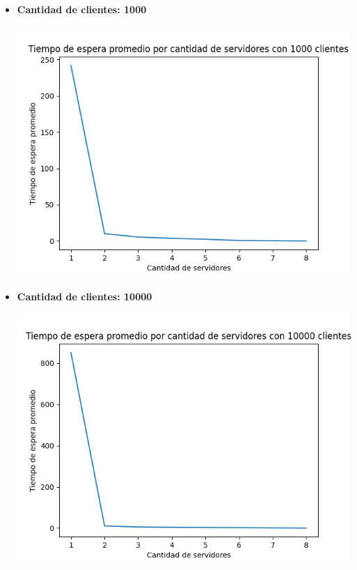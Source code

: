 \documentclass[article]{amsart}
\begin{document}
\begin{itemize}
\newpage
\begin{itemize}
\item \textbf{Cantidad de clientes: 1000}
\begin{center}
\includegraphics[scale=0.5]{../assets/Tiempo de espera promedio por cantidad de servidores con 1000 clientes.png}
\end{center}

\newpage
\item \textbf{Cantidad de clientes: 10000}
\begin{center}
\includegraphics[scale=0.5]{../assets/Tiempo de espera promedio por cantidad de servidores con 10000 clientes.png}
\end{center}

\end{itemize}


\end{itemize}
\end{document}
